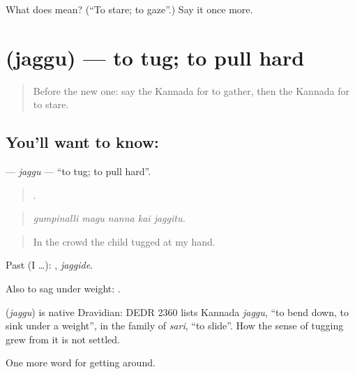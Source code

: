 \begin{tcolorbox}[breakable,colback=teal!4,colframe=teal!35!black,title={Before you move on}]
What does  mean? (\textquotedblleft{}To stare; to gaze\textquotedblright{}.) Say it once more.
\end{tcolorbox}
\section[\texorpdfstring{\kn{ಜಗ್ಗು} (jaggu)}{ಜಗ್ಗು (jaggu)}]{ (jaggu) — to tug; to pull hard}

\label{lesson:KA-C471-jaggu}



\begin{quote}
Before the new one: say the Kannada for to gather, then the Kannada for to stare.
\end{quote}

\subsection*{You'll want to know: }
\textbf{} — \emph{jaggu} — \textquotedblleft{}to tug; to pull hard\textquotedblright{}.

\begin{quote}
    .
\end{quote}

\begin{quote}
\emph{gumpinalli magu nanna kai jaggitu.}
\end{quote}

\begin{quote}
In the crowd the child tugged at my hand.
\end{quote}

Past (I …): , \emph{jaggide}.

Also to sag under weight:  .

\begin{cousinweb}
\textbf{} (\emph{jaggu}) is native Dravidian: DEDR 2360 lists Kannada \emph{jaggu}, \textquotedblleft{}to bend down, to sink under a weight\textquotedblright{}, in the family of \emph{sari}, \textquotedblleft{}to slide\textquotedblright{}. How the sense of tugging grew from it is not settled.
\end{cousinweb}

\begin{grammarlens}[title={What you've built}]
One more word for getting around.
\end{grammarlens}


